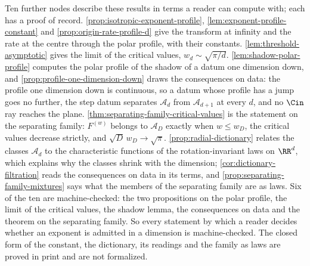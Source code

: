 Ten further nodes describe these results in terms a reader can compute with; each has a proof of
record. \ref{prop:isotropic-exponent-profile}, \ref{lem:exponent-profile-constant} and
\ref{prop:origin-rate-profile-d} give the transform at infinity and the rate at the centre
through the polar profile, with their constants. \ref{lem:threshold-asymptotic} gives the limit
of the critical values, $w_d \sim \sqrt{\pi/d}$. \ref{lem:shadow-polar-profile} computes the
polar profile of the shadow of a datum one dimension down, and
\ref{prop:profile-one-dimension-down} draws the consequences on data: the profile one dimension
down is continuous, so a datum whose profile has a jump goes no further, the step datum
separates $\mathcal{A}_d$ from $\mathcal{A}_{d+1}$ at every $d$, and no $\Cin$ ray reaches the
plane. \ref{thm:separating-family-critical-values} is the statement on the separating family:
$F^{(w)}$ belongs to $\mathcal{A}_D$ exactly when $w \le w_D$, the critical values decrease
strictly, and $\sqrt D\,w_D \to \sqrt\pi$. \ref{prop:radial-dictionary} relates the classes
$\mathcal{A}_d$ to the characteristic functions of the rotation-invariant laws on $\RR^d$, which
explains why the classes shrink with the dimension; \ref{cor:dictionary-filtration} reads the
consequences on data in its terms, and \ref{prop:separating-family-mixtures} says what the
members of the separating family are as laws. Six of the ten are machine-checked: the two
propositions on the polar profile, the limit of the critical values, the shadow lemma, the
consequences on data and the theorem on the separating family. So every statement by which a
reader decides whether an exponent is admitted in a dimension is machine-checked. The closed
form of the constant, the dictionary, its readings and the family as laws are proved in print
and are not formalized.

